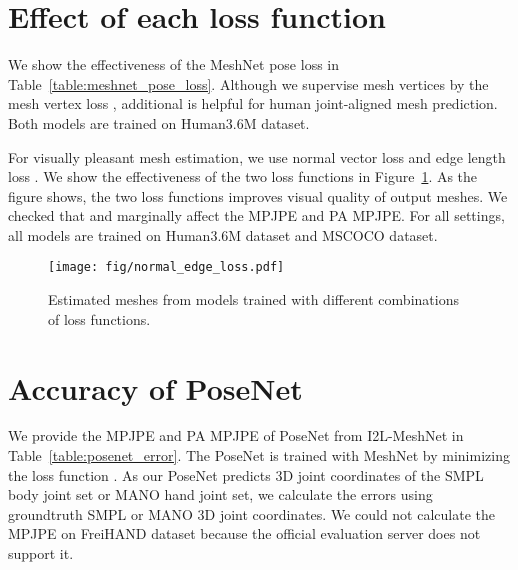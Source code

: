 \documentclass[runningheads]{llncs}
\begin{document}
\section{Effect of each loss function}
We show the effectiveness of the MeshNet pose loss  in Table~\ref{table:meshnet_pose_loss}.
Although we supervise mesh vertices by the mesh vertex loss , additional  is helpful for human joint-aligned mesh prediction.
Both models are trained on Human3.6M dataset.


For visually pleasant mesh estimation, we use normal vector loss  and edge length loss .
We show the effectiveness of the two loss functions in Figure~\ref{fig:normal_edge_loss}.
As the figure shows, the two loss functions improves visual quality of output meshes.
We checked that  and  marginally affect the MPJPE and PA MPJPE.
For all settings, all models are trained on Human3.6M dataset and MSCOCO dataset.

\begin{table}
\centering
\setlength\tabcolsep{1.0pt}
\def\arraystretch{1.1}
\caption{The MPJPE and PA MPJPE comparison between models trained with and without  on Human3.6M dataset.}
\vspace*{-7mm}
\label{table:meshnet_pose_loss}
\end{table}

\vspace*{-10mm}


\begin{figure}
\begin{center}
\texttt{[image: fig/normal\_edge\_loss.pdf]}
\end{center}
\vspace*{-7mm}
   \caption{
Estimated meshes from models trained with different combinations of loss functions.
   }
\vspace*{-8mm}
\label{fig:normal_edge_loss}
\end{figure}


\section{Accuracy of PoseNet}
We provide the MPJPE and PA MPJPE of PoseNet from I2L-MeshNet in Table~\ref{table:posenet_error}.
The PoseNet is trained with MeshNet by minimizing the loss function .
As our PoseNet predicts 3D joint coordinates of the SMPL body joint set or MANO hand joint set, we calculate the errors using groundtruth SMPL or MANO 3D joint coordinates.
We could not calculate the MPJPE on FreiHAND dataset because the official evaluation server does not support it.
\end{document}

